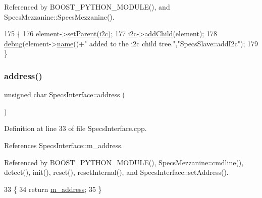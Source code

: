 Referenced by B\+O\+O\+S\+T\+\_\+\+P\+Y\+T\+H\+O\+N\+\_\+\+M\+O\+D\+U\+L\+E(), and Specs\+Mezzanine\+::\+Specs\+Mezzanine().


\begin{DoxyCode}
175                                          \{
176   element->\hyperlink{classHierarchy_a585ad1aeec16077a0e532ab8b4fc557b}{setParent}(\hyperlink{classSpecsSlave_a5210e5a45c381ee29a830b42119ec1d3}{i2c});
177   \hyperlink{classSpecsSlave_a5210e5a45c381ee29a830b42119ec1d3}{i2c}->\hyperlink{classHierarchy_ad677774ff38fcb257c04a3a10d471fac}{addChild}(element);
178   \hyperlink{classObject_aac010553f022165573714b7014a15f0d}{debug}(element->\hyperlink{classObject_a300f4c05dd468c7bb8b3c968868443c1}{name}()+\textcolor{stringliteral}{" added to the i2c child tree."},\textcolor{stringliteral}{"SpecsSlave::addI2c"});
179 \}
\end{DoxyCode}
\mbox{\label{classSpecsInterface_a0fa039a15b842a5ba783ce825b9915d8}} 
\subsubsection{\texorpdfstring{address()}{address()}}
{\footnotesize\ttfamily unsigned char Specs\+Interface\+::address (\begin{DoxyParamCaption}{ }\end{DoxyParamCaption})\hspace{0.3cm}{\ttfamily [inherited]}}



Definition at line 33 of file Specs\+Interface.\+cpp.



References Specs\+Interface\+::m\+\_\+address.



Referenced by B\+O\+O\+S\+T\+\_\+\+P\+Y\+T\+H\+O\+N\+\_\+\+M\+O\+D\+U\+L\+E(), Specs\+Mezzanine\+::cmdline(), detect(), init(), reset(), reset\+Internal(), and Specs\+Interface\+::set\+Address().


\begin{DoxyCode}
33                                       \{
34     \textcolor{keywordflow}{return} \hyperlink{classSpecsInterface_a4064da5ca6e0a172363967c4acc0b365}{m\_address};
35 \}
\end{DoxyCode}
\mbox{\label{classAttrib_aee7bbf16b144887f196e1341b24f8a26}} 
